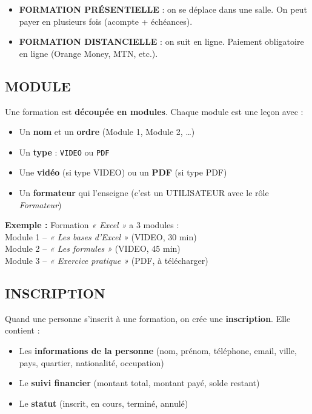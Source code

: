\documentclass[12pt,a4paper]{article}
\begin{document}
\begin{itemize}
    \item \textbf{FORMATION PRÉSENTIELLE} : on se déplace dans une salle. On peut payer en plusieurs fois (acompte + échéances).
    \item \textbf{FORMATION DISTANCIELLE} : on suit en ligne. Paiement obligatoire en ligne (Orange Money, MTN, etc.).
\end{itemize}

\noindent{}

\subsection{MODULE}

Une formation est \textbf{découpée en modules}. Chaque module est une leçon avec :
\begin{itemize}
    \item Un \textbf{nom} et un \textbf{ordre} (Module 1, Module 2, \ldots)
    \item Un \textbf{type} : \texttt{VIDEO} ou \texttt{PDF}
    \item Une \textbf{vidéo} (si type VIDEO) ou un \textbf{PDF} (si type PDF)
    \item Un \textbf{formateur} qui l'enseigne (c'est un UTILISATEUR avec le rôle \textit{Formateur})
\end{itemize}

\begin{exemplebox}
    \textbf{Exemple :} Formation \textit{« Excel »} a 3 modules : \\
    Module 1 -- \textit{« Les bases d'Excel »} (VIDEO, 30 min) \\
    Module 2 -- \textit{« Les formules »} (VIDEO, 45 min) \\
    Module 3 -- \textit{« Exercice pratique »} (PDF, à télécharger)
\end{exemplebox}

\subsection{INSCRIPTION}

Quand une personne s'inscrit à une formation, on crée une \textbf{inscription}. Elle contient :
\begin{itemize}
    \item Les \textbf{informations de la personne} (nom, prénom, téléphone, email, ville, pays, quartier, nationalité, occupation)
    \item Le \textbf{suivi financier} (montant total, montant payé, solde restant)
    \item Le \textbf{statut} (inscrit, en cours, terminé, annulé)
\end{itemize}
\end{document}
